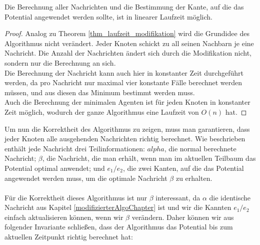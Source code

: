 	\begin{theorem}
		Die Berechnung aller Nachrichten und die Bestimmung der Kante, auf die das Potential angewendet werden sollte, ist in linearer Laufzeit möglich.
	\end{theorem}
	\begin{proof}
		Analog zu Theorem \ref{thm_laufzeit_modifikation} wird die Grundidee des Algorithmus nicht verändert. Jeder Knoten schickt zu all seinen Nachbarn je eine Nachricht. Die Anzahl der Nachrichten ändert sich durch die Modifikation nicht, sondern nur die Berechnung an sich.\\Die Berechnung der Nachricht kann auch hier in konstanter Zeit durchgeführt werden, da pro Nachricht nur maximal vier konstante Fälle berechnet werden müssen, und aus diesen das Minimum bestimmt werden muss.\\
		Auch die Berechnung der minimalen Agenten ist für jeden Knoten in konstanter Zeit möglich, wodurch der ganze Algorithmus eine Laufzeit von $O(n)$ hat.
	\end{proof}
	
	
	Um nun die Korrektheit des Algorithmus zu zeigen, muss man garantieren, dass jeder Knoten alle ausgehenden Nachrichten richtig berechnet. Wie beschrieben enthält jede Nachricht drei Teilinformationen: $alpha$, die normal berechnete Nachricht; $\beta$, die Nachricht, die man erhält, wenn man im aktuellen Teilbaum das Potential optimal anwendet; und $e_1/e_2$, die zwei Kanten, auf die das Potential angewendet werden muss, um die optimale Nachricht $\beta$ zu erhalten.
	\\
	\\
	Für die Korrektheit dieses Algorithmus ist nur $\beta$ interessant, da $\alpha$ die identische Nachricht aus Kapitel \ref{modifizierterAlgoChapter} ist und wir die Kannten $e_1/e_2$ einfach aktualisieren können, wenn wir $\beta$ verändern. Daher können wir aus folgender Invariante schließen, dass der Algorithmus das Potential bis zum aktuellen Zeitpunkt richtig berechnet hat:
	
